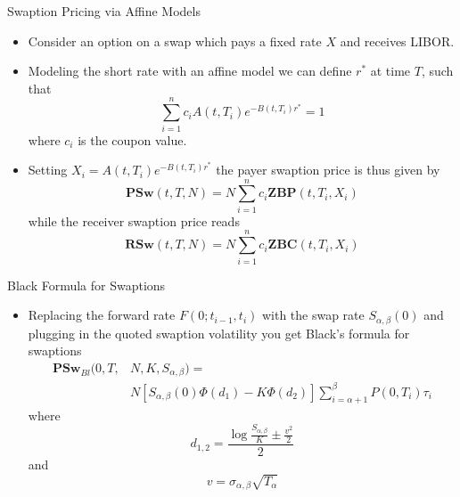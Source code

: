 \documentclass{beamer}
\begin{document}
\begin{frame}{Swaption Pricing via Affine Models}
\begin{itemize}
	\item Consider an option on a swap which pays a fixed rate $X$ and receives LIBOR.  
	\item Modeling the short rate with an affine model we can define $r^*$ at time $T$, such that
	\begin{equation*}
		\sum_{i=1}^n c_i A(t,T_i)e^{-B(t,T_i)r^*} = 1
	\end{equation*}
	where $c_i$ is the coupon value.
	\item Setting $X_i = A(t,T_i)e^{-B(t,T_i)r^*}$ the payer swaption price is thus given by
	\begin{equation}
		\textbf{PSw}(t,T,N) = N\sum_{i=1}^n c_i \textbf{ZBP}(t,T_i,X_i)
	\end{equation}
	while the receiver swaption price reads
	\begin{equation}
		\textbf{RSw}(t,T,N) = N\sum_{i=1}^n c_i \textbf{ZBC}(t,T_i,X_i)
	\end{equation}
\end{itemize}	
\end{frame}

\begin{frame}{Black Formula for Swaptions}
\begin{itemize}
	\item Replacing the forward rate $F(0;t_{i-1},t_i)$ with the swap rate $S_{\alpha,\beta}(0)$ and plugging in the quoted swaption volatility you get Black's formula for swaptions
	\begin{equation}
		\begin{aligned}
			\textbf{PSw}_{Bl}(0,T,&N,K,S_{\alpha,\beta})=\\
			&N\left[S_{\alpha,\beta}(0)\Phi(d_1)-K\Phi(d_2)\right]\sum_{i=\alpha+1}^\beta P(0,T_i)\tau_i
		\end{aligned}	
	\end{equation}
	where
	\begin{equation*}
		d_{1,2} = \frac{\log{\frac{S_{\alpha,\beta}}{K}} \pm \frac{v^2}{2}}{2}
	\end{equation*}
	and
	\begin{equation*}
		v = \sigma_{\alpha,\beta}\sqrt{T_\alpha}
	\end{equation*}
\end{itemize}
\end{frame}
\end{document}
